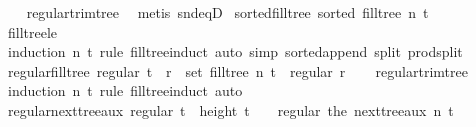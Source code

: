 \begin{isabellebody}
%
\isadelimproof
\ \ %
\endisadelimproof
%
\isatagproof
{}\isamarkupfalse%
\ regular{\isacharunderscore}{\kern0pt}trim{\isacharunderscore}{\kern0pt}tree\ \isamarkupfalse%
\ {\isacharparenleft}{\kern0pt}metis\ snd{\isacharunderscore}{\kern0pt}eqD{\isacharparenright}{\kern0pt}%
\endisatagproof
{\isafoldproof}%
%
\isadelimproof
\isanewline
%
\endisadelimproof
\isanewline
{}\isamarkupfalse%
\ sorted{\isacharunderscore}{\kern0pt}fill{\isacharunderscore}{\kern0pt}tree{\isacharcolon}{\kern0pt}\ {\isachardoublequoteopen}sorted\ {\isacharparenleft}{\kern0pt}fill{\isacharunderscore}{\kern0pt}tree\ n\ t{\isacharparenright}{\kern0pt}{\isachardoublequoteclose}\isanewline
%
\isadelimproof
\ \ %
\endisadelimproof
%
\isatagproof
{}\isamarkupfalse%
\ fill{\isacharunderscore}{\kern0pt}tree{\isacharunderscore}{\kern0pt}le\ \isamarkupfalse%
\ {\isacharparenleft}{\kern0pt}induction\ n\ t\ rule{\isacharcolon}{\kern0pt}\ fill{\isacharunderscore}{\kern0pt}tree{\isachardot}{\kern0pt}induct{\isacharparenright}{\kern0pt}\ {\isacharparenleft}{\kern0pt}auto\ simp{\isacharcolon}{\kern0pt}\ sorted{\isacharunderscore}{\kern0pt}append\ split{\isacharcolon}{\kern0pt}\ prod{\isachardot}{\kern0pt}split{\isacharparenright}{\kern0pt}%
\endisatagproof
{\isafoldproof}%
%
\isadelimproof
\isanewline
%
\endisadelimproof
\isanewline
{}\isamarkupfalse%
\ regular{\isacharunderscore}{\kern0pt}fill{\isacharunderscore}{\kern0pt}tree{\isacharcolon}{\kern0pt}\ {\isachardoublequoteopen}regular\ t\ {\isasymLongrightarrow}\ r\ {\isasymin}\ set\ {\isacharparenleft}{\kern0pt}fill{\isacharunderscore}{\kern0pt}tree\ n\ t{\isacharparenright}{\kern0pt}\ {\isasymLongrightarrow}\ regular\ r{\isachardoublequoteclose}\isanewline
%
\isadelimproof
\ \ %
\endisadelimproof
%
\isatagproof
{}\isamarkupfalse%
\ regular{\isacharunderscore}{\kern0pt}trim{\isacharunderscore}{\kern0pt}tree{\isacharprime}{\kern0pt}\ \isamarkupfalse%
\ {\isacharparenleft}{\kern0pt}induction\ n\ t\ rule{\isacharcolon}{\kern0pt}\ fill{\isacharunderscore}{\kern0pt}tree{\isachardot}{\kern0pt}induct{\isacharparenright}{\kern0pt}\ auto%
\endisatagproof
{\isafoldproof}%
%
\isadelimproof
\isanewline
%
\endisadelimproof
\isanewline
{}\isamarkupfalse%
\ regular{\isacharunderscore}{\kern0pt}next{\isacharunderscore}{\kern0pt}tree{\isacharunderscore}{\kern0pt}aux{\isacharcolon}{\kern0pt}\ {\isachardoublequoteopen}regular\ t\ {\isasymLongrightarrow}\ height\ t\ {\isasymge}\ {}\ {\isasymLongrightarrow}\ regular\ {\isacharparenleft}{\kern0pt}the\ {\isacharparenleft}{\kern0pt}next{\isacharunderscore}{\kern0pt}tree{\isacharunderscore}{\kern0pt}aux\ n\ t{\isacharparenright}{\kern0pt}{\isacharparenright}{\kern0pt}{\isachardoublequoteclose}\isanewline

\end{isabellebody}
